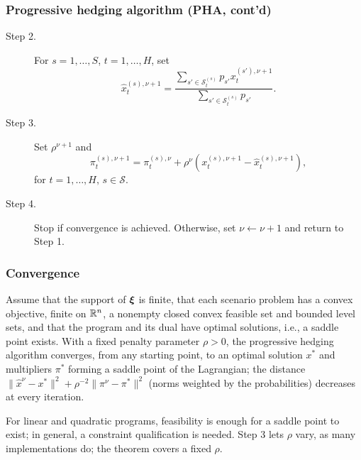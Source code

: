 \documentclass[aspectratio=169]{beamer}
\def\cS{\mathcal{S}}
\begin{document}
\begin{frame}
\frametitle{Progressive hedging algorithm (PHA, cont'd)}

\begin{description}
	\item[Step 2.]
	For $s = 1,\ldots,S$, $t = 1,\ldots,H$, set
	\[
	\hat{x}_t^{(s),\nu+1} = \frac{\sum_{s' \in \cS_{t}^{(s)}} p_{s'} x_t^{(s'),\nu+1}}{\sum_{s' \in \cS_t^{(s)}} p_{s'}}.
	\]
	\item[Step 3.]
	Set $\rho^{\nu+1}$ and
	\[
	\pi_t^{(s), \nu+1} =  \pi_t^{(s),\nu} + \rho^\nu \left( x_t^{(s),\nu+1} -  \hat{x}_t^{(s),\nu+1}  \right),
	\]
	for $t = 1, \dots, H, \, s \in \mathcal{S}$.
	\item[Step 4.]
	Stop if convergence is achieved.
	Otherwise, set $\nu \leftarrow \nu + 1$ and return to Step 1.
\end{description}

\end{frame}

\begin{frame}
\frametitle{Convergence}

\begin{theorem}
Assume that the support of ${\boldsymbol{\xi}}$ is finite, that each scenario problem has a convex objective, finite on ${\mathbb{R}}^n$, a nonempty closed convex feasible set and bounded level sets, and that the program and its dual have optimal solutions, i.e., a saddle point exists.
With a fixed penalty parameter $\rho > 0$, the progressive hedging algorithm converges, from any starting point, to an optimal solution $x^*$ and multipliers $\pi^*$ forming a saddle point of the Lagrangian; the distance $\|\hat{x}^{\nu} - x^*\|^2 + \rho^{-2}\|\pi^{\nu} - \pi^*\|^2$ (norms weighted by the probabilities) decreases at every iteration.
\end{theorem}
{\small For linear and quadratic programs, feasibility is enough for a saddle point to exist; in general, a constraint qualification is needed. Step 3 lets $\rho$ vary, as many implementations do; the theorem covers a fixed $\rho$.}

\end{frame}
\end{document}

